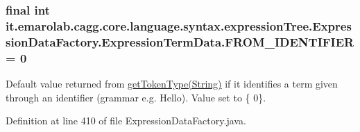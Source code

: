 \hypertarget{classit_1_1emarolab_1_1cagg_1_1core_1_1language_1_1syntax_1_1expressionTree_1_1ExpressionDataFactory_1_1ExpressionTermData_a47ff9900ae9a392118de8e056b1f334c}{
\subsubsection[{F\-R\-O\-M\-\_\-\-I\-D\-E\-N\-T\-I\-F\-I\-E\-R}]{\setlength{\rightskip}{0pt plus 5cm}final int it.\-emarolab.\-cagg.\-core.\-language.\-syntax.\-expression\-Tree.\-Expression\-Data\-Factory.\-Expression\-Term\-Data.\-F\-R\-O\-M\-\_\-\-I\-D\-E\-N\-T\-I\-F\-I\-E\-R = 0\hspace{0.3cm}{\ttfamily [static]}}}\label{classit_1_1emarolab_1_1cagg_1_1core_1_1language_1_1syntax_1_1expressionTree_1_1ExpressionDataFactory_1_1ExpressionTermData_a47ff9900ae9a392118de8e056b1f334c}
Default value returned from \hyperlink{classit_1_1emarolab_1_1cagg_1_1core_1_1language_1_1syntax_1_1expressionTree_1_1ExpressionDataFactory_1_1ExpressionTermData_ace7d61d502db7ff1a402ac0e6e983e0a}{get\-Token\-Type(\-String)} if it identifies a term given through an identifier (grammar e.\-g. Hello). Value set to \{ 0\}. 

Definition at line 410 of file Expression\-Data\-Factory.\-java.

